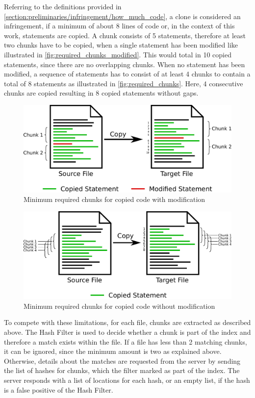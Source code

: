Referring to the definitions provided in \autoref{section:preliminaries/infringement/how_much_code}, a clone is considered an infringement, if a minimum of about 8 lines of code or, in the context of this work, statements are copied.
A chunk consists of 5 statements, therefore at least two chunks have to be copied, when a single statement has been modified like illustrated in \autoref{fig:required_chunks_modified}.
This would total in 10 copied statements, since there are no overlapping chunks.
When no statement has been modified, a sequence of statements has to consist of at least 4 chunks to contain a total of 8 statements as illustrated in \autoref{fig:required_chunks}.
Here, 4 consecutive chunks are copied resulting in 8 copied statements without gaps.

\begin{figure}[h]
	\centering
	\includegraphics[width=0.9\linewidth]{figures/required_chunks_modified.pdf}
	\caption{Minimum required chunks for copied code with modification}\label{fig:required_chunks_modified}
\end{figure}

\begin{figure}[h]
	\centering
	\includegraphics[width=0.9\linewidth]{figures/required_chunks.pdf}
	\caption{Minimum required chunks for copied code without modification}\label{fig:required_chunks}
\end{figure}

To compete with these limitations, for each file, chunks are extracted as described above.
The Hash Filter is used to decide whether a chunk is part of the index and therefore a match exists within the file.
If a file has less than 2 matching chunks, it can be ignored, since the minimum amount is two as explained above.
Otherwise, details about the matches are requested from the server by sending the list of hashes for chunks, which the filter marked as part of the index.
The server responds with a list of locations for each hash, or an empty list, if the hash is a false positive of the Hash Filter.

